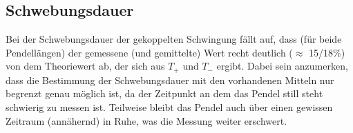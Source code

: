 \subsection{Schwebungsdauer}


Bei der Schwebungsdauer der gekoppelten Schwingung fällt auf, dass
(für beide Pendellängen) der gemessene (und gemittelte) Wert recht deutlich
($\approx$ 15/18\%) von dem Theoriewert ab, der sich aus $T_+$ und $T_-$ ergibt.
Dabei sein anzumerken, dass die Bestimmung der Schwebungsdauer mit
den vorhandenen Mitteln nur begrenzt
genau möglich ist, da der Zeitpunkt an dem das Pendel still steht schwierig
zu messen ist. Teilweise bleibt das Pendel auch über einen gewissen Zeitraum
(annähernd) in Ruhe, was die Messung weiter erschwert.
